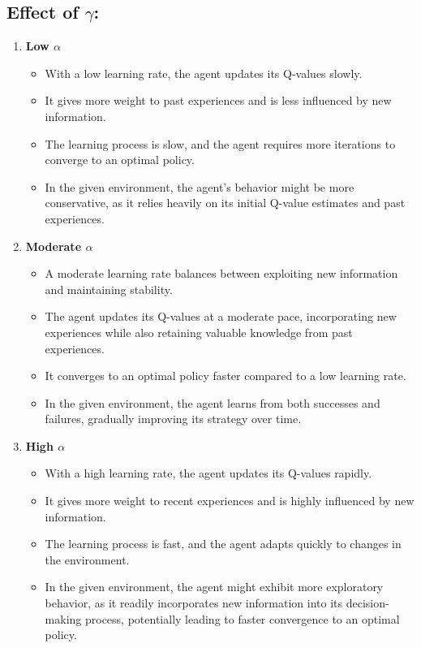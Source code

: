 \documentclass[12pt,onecolumn,a4paper]{article}
\begin{document}
\subsection*{Effect of $\gamma$:}
\begin{enumerate}
	\item{\textbf{Low $\alpha$}}
	\begin{itemize}
		\item With a low learning rate, the agent updates its Q-values slowly.
		\item It gives more weight to past experiences and is less influenced by new information.
		\item The learning process is slow, and the agent requires more iterations to converge to an optimal policy.
		\item In the given environment, the agent's behavior might be more conservative, as it relies heavily on its initial Q-value estimates and past experiences.
	\end{itemize}
	\item{\textbf{Moderate $\alpha$}}
	\begin{itemize}
		\item A moderate learning rate balances between exploiting new information and maintaining stability.
		\item The agent updates its Q-values at a moderate pace, incorporating new experiences while also retaining valuable knowledge from past experiences.
		\item It converges to an optimal policy faster compared to a low learning rate.
		\item In the given environment, the agent learns from both successes and failures, gradually improving its strategy over time.
	\end{itemize}
	\item{\textbf{High $\alpha$}}
	\begin{itemize}
		\item With a high learning rate, the agent updates its Q-values rapidly.
		\item It gives more weight to recent experiences and is highly influenced by new information.
		\item The learning process is fast, and the agent adapts quickly to changes in the environment.
		\item In the given environment, the agent might exhibit more exploratory behavior, as it readily incorporates new information into its decision-making process, potentially leading to faster convergence to an optimal policy.
	\end{itemize}
\end{enumerate}
\end{document}
